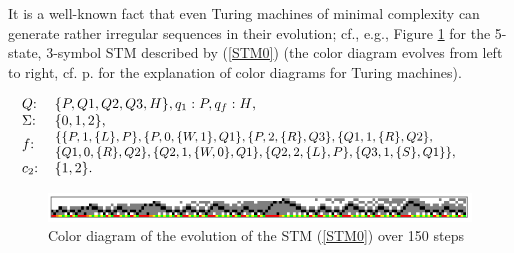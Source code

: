 \documentclass[%
  manuscript=article,   %
  year=2024,
  volume=77,
  doi=00000.000,
]{zfn}
\begin{document}
It is a well-known fact that even Turing machines of minimal complexity can generate rather irregular sequences in their evolution; cf., e.g., Figure \ref{messy} for the 5-state, 3-symbol STM described by (\ref{STM0}) (the color diagram evolves from left to right, cf. p. \pageref{colordia} for the explanation of color diagrams for Turing machines).

\begin{table}[!ht]
\begin{eqnarray}
\hspace{-0.5cm}& \begin{tabular}{ll}
$Q$: & $\{P,Q1,Q2,Q3,H\}, q_{1}:P, q_{f}:H$,\\
$\Sigma$: & $\{0,1,2\}$,\\
$f$: & \hspace{-0.2cm}\begin{small}\begin{tabular}{l}$\{\{P,1,\{L\}, P\},\{P,0,\{W,1\},Q1\},\{P,2,\{R\},Q3\},\{Q1,1,\{R\},Q2\},$\\
$\{Q1,0,\{R\},Q2\},\{Q2,1,\{W,0\},Q1\},\{Q2,2,\{L\},P\},\{Q3,1,\{S\},Q1\}\}$,\end{tabular}\end{small}\\
$c_{2}$: & $\{1, 2\}$.
\end{tabular} & \label{STM0}
\end{eqnarray}
\caption{A 5-state, 3-symbol STM inducing the irregular color diagram in Fig. \ref{messy}}
\end{table}

\begin{figure}[!ht]
    \centering
    \includegraphics[width=12.5cm]{ART_Lampert/messy.png}
\caption{Color diagram of the evolution of the STM (\ref{STM0}) over 150 steps}
    \label{messy}
\end{figure}
\end{document}
